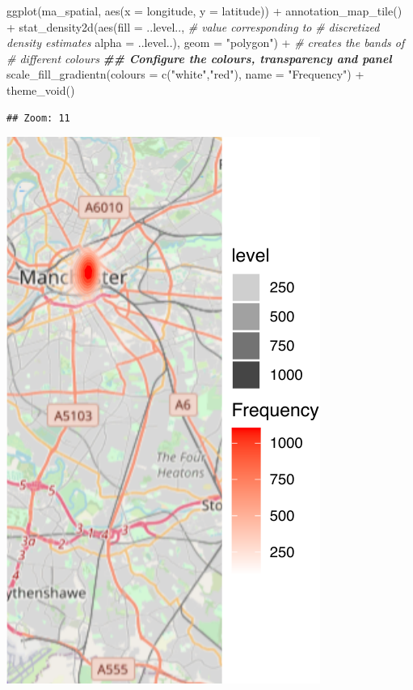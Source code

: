 \documentclass[
]{book}
\newenvironment{Shaded}{\begin{snugshade}}{\end{snugshade}}
\newcommand{\AttributeTok}[1]{\textcolor[rgb]{0.77,0.63,0.00}{#1}}
\newcommand{\CommentTok}[1]{\textcolor[rgb]{0.56,0.35,0.01}{\textit{#1}}}
\newcommand{\DocumentationTok}[1]{\textcolor[rgb]{0.56,0.35,0.01}{\textbf{\textit{#1}}}}
\newcommand{\FunctionTok}[1]{\textcolor[rgb]{0.00,0.00,0.00}{#1}}
\newcommand{\NormalTok}[1]{#1}
\newcommand{\SpecialCharTok}[1]{\textcolor[rgb]{0.00,0.00,0.00}{#1}}
\newcommand{\StringTok}[1]{\textcolor[rgb]{0.31,0.60,0.02}{#1}}
\begin{document}
\begin{Shaded}
\begin{Highlighting}[]
\FunctionTok{ggplot}\NormalTok{(ma\_spatial, }\FunctionTok{aes}\NormalTok{(}\AttributeTok{x =}\NormalTok{ longitude, }\AttributeTok{y =}\NormalTok{ latitude)) }\SpecialCharTok{+} 
  \FunctionTok{annotation\_map\_tile}\NormalTok{() }\SpecialCharTok{+} 
  \FunctionTok{stat\_density2d}\NormalTok{(}\FunctionTok{aes}\NormalTok{(}\AttributeTok{fill =}\NormalTok{ ..level.., }\CommentTok{\# value corresponding to }
                                       \CommentTok{\# discretized density estimates }
                     \AttributeTok{alpha =}\NormalTok{ ..level..), }
                 \AttributeTok{geom =} \StringTok{"polygon"}\NormalTok{) }\SpecialCharTok{+}  \CommentTok{\# creates the bands of }
                                      \CommentTok{\# different colours}
  \DocumentationTok{\#\# Configure the colours, transparency and panel}
  \FunctionTok{scale\_fill\_gradientn}\NormalTok{(}\AttributeTok{colours =} \FunctionTok{c}\NormalTok{(}\StringTok{"white"}\NormalTok{,}\StringTok{"red"}\NormalTok{), }
                       \AttributeTok{name =} \StringTok{"Frequency"}\NormalTok{) }\SpecialCharTok{+} 
  \FunctionTok{theme\_void}\NormalTok{()}
\end{Highlighting}
\end{Shaded}

\begin{verbatim}
## Zoom: 11
\end{verbatim}

\includegraphics{crime_mapping_files/figure-latex/unnamed-chunk-130-1.pdf}
\end{document}
